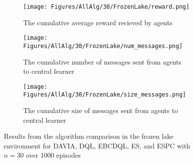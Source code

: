 \begin{figure}
    \centering
    \begin{subfigure}{0.6\textwidth}
        \centering
        \texttt{[image: Figures/AllAlg/30/FrozenLake/reward.png]}
        \caption{The cumulative average reward recieved by agents}
        \label{fig:AlgsFLReward}
    \end{subfigure}
    \begin{subfigure}{0.6\textwidth}
        \centering
        \texttt{[image: Figures/AllAlg/30/FrozenLake/num\_messages.png]}
        \caption{The cumulative number of messages sent from agents to central learner}
        \label{fig:AlgsFLNumMessages}
    \end{subfigure}
    \begin{subfigure}{0.6\textwidth}
        \centering
        \texttt{[image: Figures/AllAlg/30/FrozenLake/size\_messages.png]}
        \caption{The cumulative size of messages sent from agents to central learner}
        \label{fig:AlgsFLSizeMessages}
    \end{subfigure}
    \caption{Results from the algorithm comparison in the frozen lake environment for DAVIA, DQL, EBCDQL, ES, and ESPC with $n=30$ over 1000 episodes}
    \label{fig:AlgsFL}
\end{figure}

